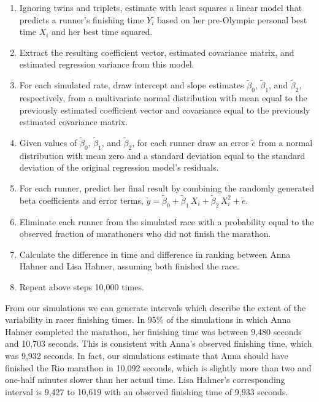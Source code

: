 \documentclass[12pt,titlepage]{article}
\begin{document}
\begin{enumerate}
\item Ignoring twins and triplets, estimate with least squares a
  linear model that predicts a runner's finishing time $Y_i$ based on
  her pre-Olympic personal best time $X_i$ and her best time squared.
\item Extract the resulting coefficient vector, estimated covariance
  matrix, and estimated regression variance from this model.
\item For each simulated rate, draw intercept and slope estimates
  $\tilde{\beta}_0$, $\tilde{\beta}_1$, and $\tilde{\beta}_2$,
  respectively, from a multivariate normal distribution with mean
  equal to the previously estimated coefficient vector and covariance
  equal to the previously estimated covariance matrix.
\item Given values of $\tilde{\beta}_0$, $\tilde{\beta}_1$, and
  $\tilde{\beta}_2$, for each runner draw an error $\tilde{e}$ from a
  normal distribution with mean zero and a standard deviation equal to
  the standard deviation of the original regression model's residuals.
\item For each runner, predict her final result by combining the
  randomly generated beta coefficients and error terms,
  $\tilde{y} = \tilde{\beta}_0 + \tilde{\beta}_1\,X_i +
  \tilde{\beta}_2\,X_i^2 + \tilde{e}$.
\item Eliminate each runner from the simulated race with a probability
  equal to the observed fraction of marathoners who did not finish the
  marathon.
\item Calculate the difference in time and difference in ranking
  between Anna Hahner and Lisa Hahner, assuming both finished the
  race.
\item Repeat above steps 10,000 times.
\end{enumerate}


From our simulations we can generate intervals which describe the
extent of the variability in racer finishing times.  In 95\% of the
simulations in which Anna Hahner completed the marathon, her finishing
time was between 9,480 seconds and 10,703 seconds.  This is consistent
with Anna's observed finishing time, which was 9,932 seconds.  In
fact, our simulations estimate that Anna should have finished the Rio
marathon in 10,092 seconds, which is slightly more than two and
one-half minutes slower than her actual time.  Lisa Hahner's
corresponding interval is 9,427 to 10,619 with an observed finishing
time of 9,933 seconds. 
\end{document}
